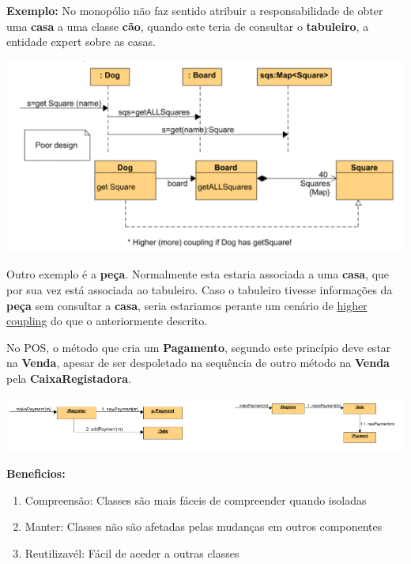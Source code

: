 \documentclass{article}
\begin{document}
\begin{flushleft}
    \textbf{Exemplo:} No monopólio não faz sentido atribuir a responsabilidade de obter uma \textbf{casa} a uma classe \textbf{cão}, quando
    este teria de consultar o \textbf{tabuleiro}, a entidade expert sobre as casas.

    \begin{center}
        \includegraphics[scale=0.5]{Images/14.png}
    \end{center}

    Outro exemplo é a \textbf{peça}. Normalmente esta estaria associada a uma \textbf{casa}, que por sua vez está associada
    ao tabuleiro. Caso o tabuleiro tivesse informações da \textbf{peça} sem consultar a \textbf{casa}, seria estariamos
    perante um cenário de \uline{higher coupling} do que o anteriormente descrito.

    No POS, o método que cria um \textbf{Pagamento}, segundo este princípio deve estar na \textbf{Venda}, apesar de ser
    despoletado na sequência de outro método na \textbf{Venda} pela \textbf{CaixaRegistadora}.

    \begin{center}
        \includegraphics[scale=0.5]{Images/15.png}
    \end{center}
\end{flushleft}

\pagebreak

\begin{flushleft}
    \textbf{Beneficios:} 
    \begin{enumerate}
        \item Compreensão: Classes são mais fáceis de compreender quando isoladas
        \item Manter: Classes não são afetadas pelas mudanças em outros componentes
        \item Reutilizavél: Fácil de aceder a outras classes
    \end{enumerate}
\end{flushleft}
\end{document}
